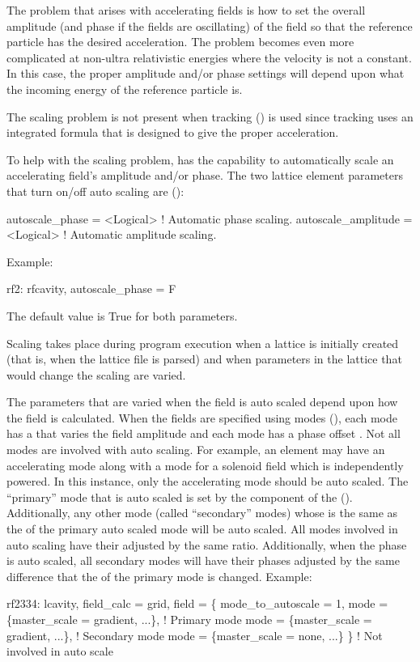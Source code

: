 The problem that arises with accelerating fields is how to set the
overall amplitude (and phase if the fields are oscillating) of the
field so that the reference particle has the desired acceleration. The
problem becomes even more complicated at non-ultra relativistic
energies where the velocity is not a constant. In this case, the
proper amplitude and/or phase settings will depend upon what the
incoming energy of the reference particle is.

The scaling problem is not present when  tracking
() is used since  tracking uses an
integrated formula that is designed to give the proper acceleration.

To help with the scaling problem, \bmad has the capability to automatically
scale an accelerating field's amplitude and/or phase. The two
lattice element parameters that turn on/off auto scaling are ():
\begin{example}
  autoscale_phase      = <Logical>  ! Automatic phase scaling.
  autoscale_amplitude  = <Logical>  ! Automatic amplitude scaling.
\end{example}
Example:
\begin{example}
  rf2: rfcavity, autoscale_phase = F
\end{example}
The default value is True for both parameters. 

Scaling takes place during program execution when a lattice is
initially created (that is, when the lattice file is parsed) and when
parameters in the lattice that would change the scaling are varied.

The parameters that are varied when the field is auto scaled depend
upon how the field is calculated. When the fields are specified using
modes (), each mode has a  that
varies the field amplitude and each mode has a phase offset
. Not all modes are involved with auto scaling. For
example, an  element may have an accelerating mode along
with a mode for a solenoid field which is independently powered. In
this instance, only the accelerating mode should be auto scaled. The
``primary'' mode that is auto scaled is set by the
 component of the 
(). Additionally, any other mode (called ``secondary''
modes) whose  is the same as the  of
the primary auto scaled mode will be auto scaled. All modes involved in
auto scaling have their  adjusted by the same ratio.
Additionally, when the phase is auto scaled, all secondary modes will
have their  phases adjusted by the same difference that
the  of the primary mode is changed. Example:
\begin{example}
  rf2334: lcavity, field_calc = grid, field = \{
    mode_to_autoscale = 1,
    mode = \{master_scale = gradient, ...\},   ! Primary mode
    mode = \{master_scale = gradient, ...\},   ! Secondary mode
    mode = \{master_scale = none, ...\} \}      ! Not involved in auto scale
\end{example}

